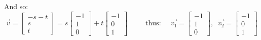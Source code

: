 \documentclass{article}
\begin{document}
    And so: $$
    \vec{v}=\begin{bmatrix} 
    -s-t\\s\\t
    \end{bmatrix}=s\begin{bmatrix} 
    -1\\1\\0
    \end{bmatrix}+t\begin{bmatrix} 
    -1\\0\\1
    \end{bmatrix}\;\;\;\;\;\;\;\;\;\text{thus:}\;\;\;\;\;\vec{v_{1}}=\begin{bmatrix} 
    -1\\1\\0
    \end{bmatrix},\;\;\vec{v_{2}}=\begin{bmatrix} 
    -1\\0\\1
    \end{bmatrix}$$
\end{document}
